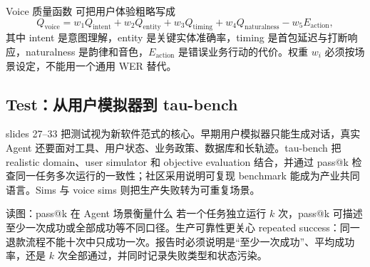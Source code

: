 
\begin{importantbox}{Voice 质量函数}
可把用户体验粗略写成
\[
Q_{\text{voice}}
=w_1Q_{\text{intent}}+w_2Q_{\text{entity}}+w_3Q_{\text{timing}}+w_4Q_{\text{naturalness}}-w_5E_{\text{action}},
\]
其中 intent 是意图理解，entity 是关键实体准确率，timing 是首包延迟与打断响应，naturalness 是韵律和音色，$E_{\text{action}}$ 是错误业务行动的代价。权重 $w_i$ 必须按场景设定，不能用一个通用 WER 替代。
\end{importantbox}

\subsection{Test：从用户模拟器到 tau-bench}

slides 27--33 把测试视为新软件范式的核心。早期用户模拟器只能生成对话，真实 Agent 还要面对工具、用户状态、业务政策、数据库和长轨迹。tau-bench 把 realistic domain、user simulator 和 objective evaluation 结合，并通过 pass@k 检查同一任务多次运行的一致性；社区采用说明可复现 benchmark 能成为产业共同语言。Sims 与 voice sims 则把生产失败转为可重复场景。


\begin{knowledgebox}{读图：pass@k 在 Agent 场景衡量什么}
若一个任务独立运行 $k$ 次，pass@k 可描述至少一次成功或全部成功等不同口径。生产可靠性更关心 repeated success：同一退款流程不能十次中只成功一次。报告时必须说明是“至少一次成功”、平均成功率，还是 $k$ 次全部通过，并同时记录失败类型和状态污染。
\end{knowledgebox}

